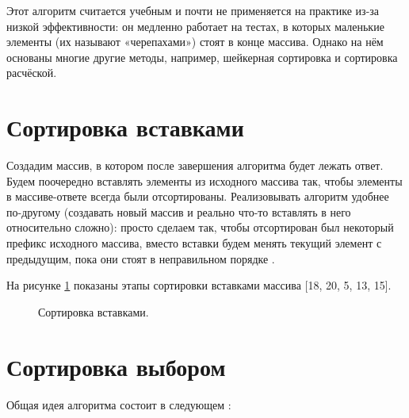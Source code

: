 \documentclass[12pt]{report}
\begin{document}
	Этот алгоритм считается учебным и почти не применяется на практике из-за низкой эффективности: он медленно работает на тестах, в которых маленькие элементы (их называют «черепахами») стоят в конце массива. Однако на нём основаны многие другие методы, например, шейкерная сортировка и сортировка расчёской.
	
	
	\section{Сортировка вставками}
	
	Создадим массив, в котором после завершения алгоритма будет лежать ответ. Будем поочередно вставлять элементы из исходного массива так, чтобы элементы в массиве-ответе всегда были отсортированы. Реализовывать алгоритм удобнее по-другому (создавать новый массив и реально что-то вставлять в него относительно сложно): просто сделаем так, чтобы отсортирован был некоторый префикс исходного массива, вместо вставки будем менять текущий элемент с предыдущим, пока они стоят в неправильном порядке \cite{insert}.
	
	На рисунке \ref{fig:ins_s} показаны этапы сортировки вставками массива [18, 20, 5, 13, 15].
	
	\begin{figure}[h]
		\caption{Сортировка вставками.}
		\label{fig:ins_s}
	\end{figure}
	
	\newpage
	
	\section{Сортировка выбором}
	Общая идея алгоритма состоит в следующем \cite{select}:
	
\end{document}
